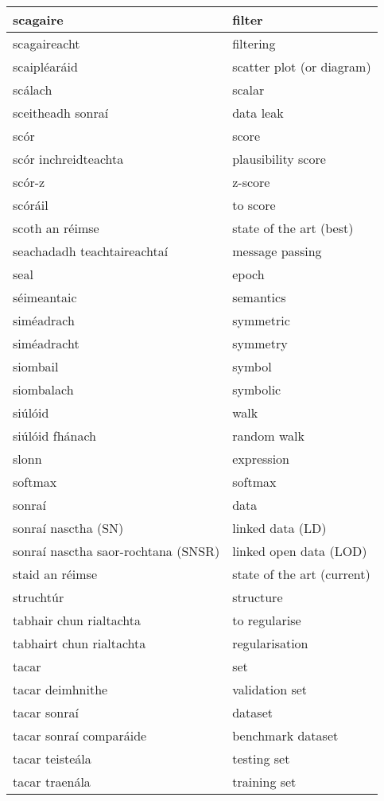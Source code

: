 \begin{longtable}{|l|l|}
		scagaire&filter\\ \hline 
		scagaireacht&filtering\\ \hline 
		scaipléaráid&scatter plot (or diagram)\\ \hline 
		scálach&scalar\\ \hline 
		sceitheadh sonraí&data leak\\ \hline 
		scór&score\\ \hline 
		scór inchreidteachta&plausibility score\\ \hline 
		scór-z&z-score\\ \hline 
		scóráil&to score\\ \hline 
		scoth an réimse&state of the art (best)\\ \hline 
		seachadadh teachtaireachtaí&message passing\\ \hline 
		seal&epoch\\ \hline 
		séimeantaic&semantics\\ \hline 
		siméadrach&symmetric\\ \hline 
		siméadracht&symmetry\\ \hline 
		siombail&symbol\\ \hline 
		siombalach&symbolic\\ \hline 
		siúlóid&walk\\ \hline 
		siúlóid fhánach&random walk\\ \hline 
		slonn&expression\\ \hline 
		softmax&softmax\\ \hline 
		sonraí&data\\ \hline 
		sonraí nasctha (SN)&linked data (LD)\\ \hline 
		sonraí nasctha saor-rochtana (SNSR)&linked open data (LOD)\\ \hline 
		staid an réimse&state of the art (current)\\ \hline 
		struchtúr&structure\\ \hline 
		tabhair chun rialtachta&to regularise\\ \hline 
		tabhairt chun rialtachta&regularisation\\ \hline 
		tacar&set\\ \hline 
		tacar deimhnithe&validation set\\ \hline 
		tacar sonraí&dataset\\ \hline 
		tacar sonraí comparáide&benchmark dataset\\ \hline 
		tacar teisteála&testing set\\ \hline 
		tacar traenála&training set\\ \hline 

\end{longtable}
